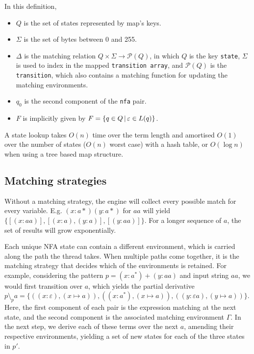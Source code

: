 In this definition,

\begin{itemize}
   \item $Q$ is the set of states represented by map's keys.
   \item $\Sigma$ is the set of bytes between 0 and 255.
   \item $\Delta$ is the matching relation $Q \times \Sigma \to \mathcal{P}(Q)$,
      in which $Q$ is the key \texttt{state}, $\Sigma$ is used to index in the
      mapped \texttt{transition array}, and $\mathcal{P}(Q)$ is the
      \texttt{transition}, which also contains a matching function for updating
      the matching environments.
   \item $q_0$ is the second component of the \texttt{nfa} pair.
   \item $F$ is implicitly given by $F = \{ q \in Q \operatorname{|} \varepsilon \in L(q) \}$.
\end{itemize}

A state lookup takes $O(n)$ time over the term length and amortised $O(1)$ over
the number of states ($O(n)$ worst case) with a hash table, or $O(\log n)$ when
using a tree based map structure.


\subsection{Matching strategies}

Without a matching strategy, the engine will collect every possible match for
every variable. E.g. $(x:a*)(y:a*)$ for $aa$ will yield $\{[(x:aa)], [(x:a),
(y:a)], [(y:aa)]\}$. For a longer sequence of $a$, the set of results will grow
exponentially.

Each unique NFA state can contain a different environment, which is carried
along the path the thread takes. When multiple paths come together, it is the
matching strategy that decides which of the environments is retained. For
example, considering the pattern $p = (x:a^*) + (y:aa)$ and input string $aa$,
we would first transition over $a$, which yields the partial derivative $p
\setminus_p a = \{ ((x:\varepsilon), (x \mapsto a)), ((x:a^*), (x \mapsto a)),
((y:\varepsilon a), (y \mapsto a)) \}$. Here, the first component of each pair
is the expression matching at the next state, and the second component is the
associated matching environment $\Gamma$. In the next step, we derive each of
these terms over the next $a$, amending their respective environments, yielding
a set of new states for each of the three states in $p'$.

